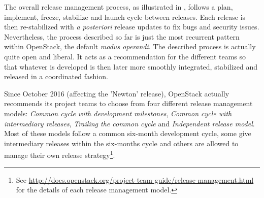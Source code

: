 The overall release management process, as illustrated in , follows a plan, implement, freeze, stabilize and launch cycle between releases. Each release is then re-stabilized with \emph{a posteriori} release updates to fix bugs and security issues. Nevertheless, the process described so far is just the most recurrent pattern within OpenStack, the default \emph{modus operandi}. The described process is actually quite open and liberal. It acts as a recommendation for the different teams so that whatever is developed is then later more smoothly integrated, stabilized and released in a coordinated fashion. 
%

Since October 2016 (affecting the 'Newton' release), OpenStack actually recommends its project teams to choose from four different release management models: \emph{Common cycle with development milestones}, \emph{Common cycle with intermediary releases}, \emph{Trailing the common cycle} and \emph{Independent release model}.  
Most of these models follow a common six-month development cycle, some give intermediary releases within the six-months cycle and others are allowed to manage their own release strategy\footnote{See \url{http://docs.openstack.org/project-team-guide/release-management.html} for the details of each release management model.}.  

